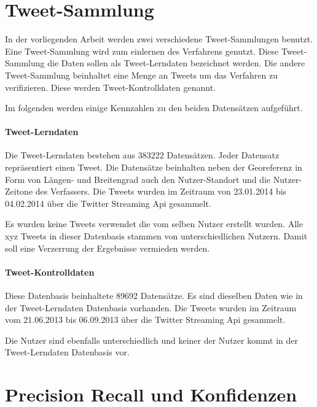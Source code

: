 	\section{Tweet-Sammlung} 
		
		In der vorliegenden Arbeit werden zwei verschiedene Tweet-Sammlungen benutzt.
		Eine Tweet-Sammlung wird zum einlernen des Verfahrens genutzt.
		Diese Tweet-Sammlung die Daten sollen als Tweet-Lerndaten bezeichnet werden.
		Die andere Tweet-Sammlung beinhaltet eine Menge an Tweets um das Verfahren zu verifizieren.
		Diese werden Tweet-Kontrolldaten genannt.

		Im folgenden werden einige Kennzahlen zu den beiden Datensätzen aufgeführt.

		\paragraph{Tweet-Lerndaten} 

			Die Tweet-Lerndaten bestehen aus 383222 Datensätzen.
			Jeder Datensatz repräsentiert einen Tweet. 
			Die Datensätze beinhalten neben der Georeferenz in Form von Längen- und Breitengrad auch den Nutzer-Standort und die Nutzer-Zeitone des Verfassers.
			Die Tweets wurden im Zeitraum von 23.01.2014 bis 04.02.2014 über die Twitter Streaming Api gesammelt.

			Es wurden keine Tweets verwendet die vom selben Nutzer erstellt wurden. 
			Alle xyz Tweets in dieser Datenbasis stammen von unterschiedlichen Nutzern. 
			Damit soll eine Verzerrung der Ergebnisse vermieden werden.

		\paragraph{Tweet-Kontrolldaten}

			Diese Datenbasis beinhaltete 89692 Datensätze.
			Es sind dieselben Daten wie in der Tweet-Lerndaten Datenbasis vorhanden.
			Die Tweets wurden im Zeitraum vom 21.06.2013 bis 06.09.2013 über die Twitter Streaming Api gesammelt.

			Die Nutzer sind ebenfalls unterschiedlich und keiner der Nutzer kommt in der Tweet-Lerndaten Datenbasis vor.

	\section{Precision Recall und Konfidenzen}



	
